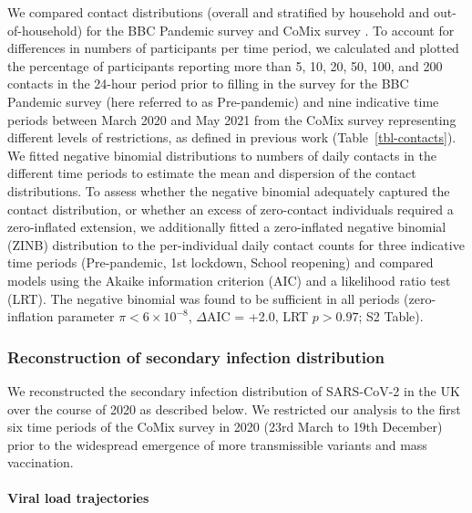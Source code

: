 \documentclass[
  10pt,
  letterpaper,
]{article}
\begin{document}
We compared contact distributions (overall and stratified by household
and out-of-household) for the BBC Pandemic survey
\citep{klepac2018, klepac2020, kucharski2020} and CoMix survey
\citep{jarvis2020, gimma2022}. To account for differences in numbers of
participants per time period, we calculated and plotted the percentage
of participants reporting more than 5, 10, 20, 50, 100, and 200 contacts
in the 24-hour period prior to filling in the survey for the BBC
Pandemic survey (here referred to as Pre-pandemic) and nine indicative
time periods between March 2020 and May 2021 from the CoMix survey
representing different levels of restrictions, as defined in previous
work \citep{jarvis2020, gimma2022} (Table~\ref{tbl-contacts}). We fitted
negative binomial distributions to numbers of daily contacts in the
different time periods to estimate the mean and dispersion of the
contact distributions. To assess whether the negative binomial
adequately captured the contact distribution, or whether an excess of
zero-contact individuals required a zero-inflated extension, we
additionally fitted a zero-inflated negative binomial (ZINB)
distribution to the per-individual daily contact counts for three
indicative time periods (Pre-pandemic, 1st lockdown, School reopening)
and compared models using the Akaike information criterion (AIC) and a
likelihood ratio test (LRT). The negative binomial was found to be
sufficient in all periods (zero-inflation parameter
\(\pi < 6\times 10^{-8}\), \(\Delta\)AIC = +2.0, LRT \(p > 0.97\); S2
Table).

\subsubsection{Reconstruction of secondary infection
distribution}\label{reconstruction-of-secondary-infection-distribution}

We reconstructed the secondary infection distribution of SARS-CoV-2 in
the UK over the course of 2020 as described below. We restricted our
analysis to the first six time periods of the CoMix survey in 2020 (23rd
March to 19th December) prior to the widespread emergence of more
transmissible variants and mass vaccination.

\paragraph{Viral load trajectories}\label{viral-load-trajectories}
\end{document}

